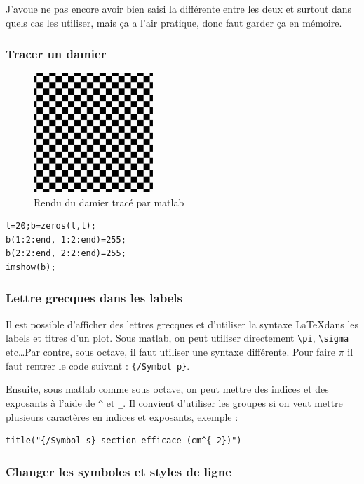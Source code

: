 \documentclass[a4paper,twoside]{article}
\begin{document}
J'avoue ne pas encore avoir bien saisi la différente entre les deux et surtout dans quels cas les utiliser, mais ça a l'air pratique, donc faut garder ça en mémoire.

\subsubsection{Tracer un damier}
\begin{figure}[htb]
\centering
\includegraphics[width=0.4\textwidth]{figure/matlab_damier.pdf}
\caption{Rendu du damier tracé par matlab}
\end{figure}

\begin{verbatim}
l=20;b=zeros(l,l);
b(1:2:end, 1:2:end)=255;
b(2:2:end, 2:2:end)=255;
imshow(b);
\end{verbatim}

\subsubsection{Lettre grecques dans les labels}
Il est possible d'afficher des lettres grecques et d'utiliser la syntaxe \LaTeX dans les labels et titres d'un plot. Sous matlab, on peut utiliser directement \verb|\pi|, \verb|\sigma| etc\dots Par contre, sous octave, il faut utiliser une syntaxe différente. Pour faire $\pi$ il faut rentrer le code suivant : \verb|{/Symbol p}|.

Ensuite, sous matlab comme sous octave, on peut mettre des indices et des exposants à l'aide de \verb|^| et \verb|_|. Il convient d'utiliser les groupes si on veut mettre plusieurs caractères en indices et exposants, exemple :

\begin{verbatim}
title("{/Symbol s} section efficace (cm^{-2})")
\end{verbatim}

\subsubsection{Changer les symboles et styles de ligne}
\end{document}
